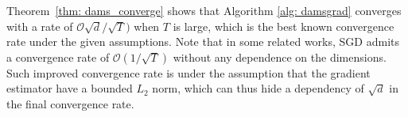 \documentclass{article} %
\begin{document}
Theorem~\ref{thm: dams_converge} shows that Algorithm \ref{alg: damsgrad} converges with a rate of  $\mathcal{O}\sqrt{d}/\sqrt{T})$ when $T$ is large, which is the best known convergence rate under the given assumptions. 
Note that in some related works, SGD admits a convergence rate of $\mathcal{O}(1/\sqrt{T})$ without any dependence on the dimensions.
Such improved convergence rate is under the assumption that the gradient estimator have a bounded $L_2$ norm, which can thus hide a dependency of $\sqrt{d}$ in the final convergence rate. 







\end{document}
